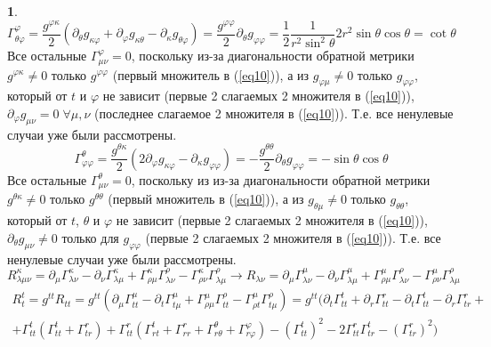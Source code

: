 \documentclass[12pt]{article}
\theoremstyle{definition}
\newtheorem{zad}{}[section]
\begin{document}
\begin{zad}
\begin{equation}
    \Gamma^\varphi_{\theta\varphi}=\frac{g^{\varphi\kappa}}{2}(\partial_\theta g_{\kappa\varphi}+\partial_\varphi g_{\kappa\theta}-\partial_\kappa g_{\theta\varphi})=\frac{g^{\varphi\varphi}}{2}\partial_\theta g_{\varphi\varphi}=\frac{1}{2}\frac{1}{r^2\sin^2\theta}2r^2\sin\theta\cos\theta=\cot\theta
\end{equation}
Все остальные $\Gamma^\varphi_{\mu\nu}=0$, поскольку из-за диагональности обратной метрики $g^{\varphi\kappa}\neq0$ только $g^{\varphi\varphi}$ (первый множитель в (\ref{eq10})), а из $g_{\varphi\mu}\neq0$ только $g_{\varphi\varphi}$, который от $t$ и $\varphi$ не зависит (первые 2 слагаемых 2 множителя в (\ref{eq10})), $\partial_\varphi g_{\mu\nu}=0\;\forall\mu,\nu$ (последнее слагаемое 2 множителя в (\ref{eq10})). Т.е. все ненулевые случаи уже были рассмотрены.
\begin{equation}
    \Gamma^\theta_{\varphi\varphi}=\frac{g^{\theta\kappa}}{2}(2\partial_\varphi g_{\kappa\varphi}-\partial_\kappa g_{\varphi\varphi})=-\frac{g^{\theta\theta}}{2}\partial_\theta g_{\varphi\varphi}=-\sin\theta\cos\theta
\end{equation}
Все остальные $\Gamma^\theta_{\mu\nu}=0$, поскольку из из-за диагональности обратной метрики $g^{\theta\kappa}\neq0$ только $g^{\theta\theta}$ (первый множитель в (\ref{eq10})), а из $g_{\theta\mu}\neq0$ только $g_{\theta\theta}$, который от $t$, $\theta$ и $\varphi$ не зависит (первые 2 слагаемых 2 множителя в (\ref{eq10})), $\partial_\theta g_{\mu\nu}\neq0$ только для $g_{\varphi\varphi}$ (первые 2 слагаемых 2 множителя в (\ref{eq10})). Т.е. все ненулевые случаи уже были рассмотрены.
\begin{equation}
    R^\kappa_{\lambda\mu\nu}=\partial_\mu\Gamma^\kappa_{\lambda\nu}-\partial_\nu\Gamma^\kappa_{\lambda\mu}+\Gamma^\kappa_{\rho\mu}\Gamma^\rho_{\lambda\nu}-\Gamma^\kappa_{\rho\nu}\Gamma^\rho_{\lambda\mu}\rightarrow R_{\lambda\nu}=\partial_\mu\Gamma^\mu_{\lambda\nu}-\partial_\nu\Gamma^\mu_{\lambda\mu}+\Gamma^\mu_{\rho\mu}\Gamma^\rho_{\lambda\nu}-\Gamma^\mu_{\rho\nu}\Gamma^\rho_{\lambda\mu}
\end{equation}
\begin{multline}
    R_t^t=g^{tt}R_{tt}=g^{tt}(\partial_\mu\Gamma^\mu_{tt}-\partial_t\Gamma^\mu_{t\mu}+\Gamma^\mu_{\rho\mu}\Gamma^\rho_{tt}-\Gamma^\mu_{\rho t}\Gamma^\rho_{t\mu})=g^{tt}(\partial_t\Gamma^t_{tt}+\partial_r\Gamma^r_{tt}-\partial_t\Gamma^t_{tt}-\partial_r\Gamma^r_{tr}+\\+\Gamma^t_{tt}(\Gamma^t_{tt}+\Gamma^r_{tr})+\Gamma^r_{tt}(\Gamma^t_{rt}+\Gamma^r_{rr}+\Gamma^\theta_{r\theta}+\Gamma^\varphi_{r\varphi})-(\Gamma^t_{tt})^2-2\Gamma^r_{tt}\Gamma^t_{tr}-(\Gamma^r_{tr})^2)

\end{multline}
\end{zad}
\end{document}
